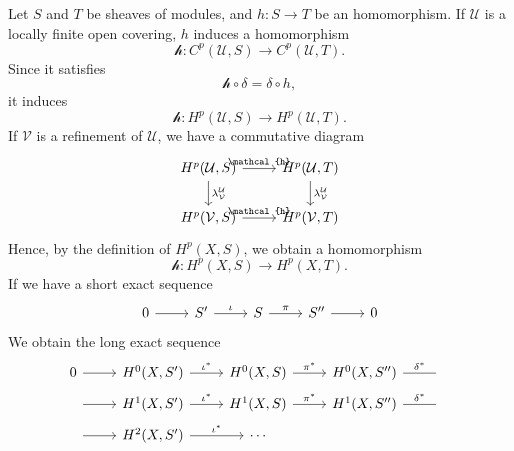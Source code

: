 \documentclass[12pt]{article}
\begin{document}
Let \(S\) and \(T\) be sheaves of modules, and \(h\colon S\to T\) be an homomorphism.
If \(\mathcal{U}\) is a locally finite open covering, \(h\) induces a homomorphism \[
  \mathcal{h}\colon C^p(\mathcal{U},S)\longrightarrow C^p(\mathcal{U},T)
.\] Since it satisfies \[
  \mathcal{h}\circ \delta=\delta\circ h,
\] it induces \[
  \mathcal{h}\colon H^p(\mathcal{U},S)\longrightarrow H^p(\mathcal{U},T)
.\] If \(\mathcal{V}\) is a refinement of \(\mathcal{U}\), we have a commutative
diagram
\[\begin{tikzcd}
	{H^p(\mathcal{U},S)} & {H^p(\mathcal{U},T)} \\
	{H^p(\mathcal{V},S)} & {H^p(\mathcal{V},T)}
	\arrow["{\mathcal{h}}", from=2-1, to=2-2]
	\arrow["{\mathcal{h}}", from=1-1, to=1-2]
	\arrow["{\lambda_{\mathcal{V}}^{\mathcal{U}}}", from=1-1, to=2-1]
	\arrow["{\lambda_{\mathcal{V}}^{\mathcal{U}}}", from=1-2, to=2-2]
\end{tikzcd}\]
Hence, by the definition of \(H^p(X,S)\), we obtain a homomorphism \[
  \mathcal{h}\colon H^p(X,S)\longrightarrow H^p(X,T)
.\] If we have a short exact sequence
\[\begin{tikzcd}
	0 & {S'} & S & {S''} & 0
	\arrow[from=1-1, to=1-2]
	\arrow["\iota", from=1-2, to=1-3]
	\arrow["\pi", from=1-3, to=1-4]
	\arrow[from=1-4, to=1-5]
\end{tikzcd}\]
We obtain the long exact sequence
\[\begin{tikzcd}[row sep=tiny]
	0 & {H^0(X,S')} & {H^0(X,S)} & {H^0(X,S'')} & {\phantom{0}} \\
	{\phantom{0}} & {H^1(X,S')} & {H^1(X,S)} & {H^1(X,S'')} & {\phantom{0}} \\
	{\phantom{0}} & {H^2(X,S')} & \cdots
	\arrow[from=1-1, to=1-2]
	\arrow["{\iota^*}", from=1-2, to=1-3]
	\arrow["{\pi^*}", from=1-3, to=1-4]
	\arrow["{\delta^*}", no head, from=1-4, to=1-5]
	\arrow["{\iota^*}", from=3-2, to=3-3]
	\arrow[from=3-1, to=3-2]
	\arrow[from=2-1, to=2-2]
	\arrow["{\iota^*}", from=2-2, to=2-3]
	\arrow["{\pi^*}", from=2-3, to=2-4]
	\arrow["{\delta^*}", no head, from=2-4, to=2-5]
\end{tikzcd}\]
\end{document}
